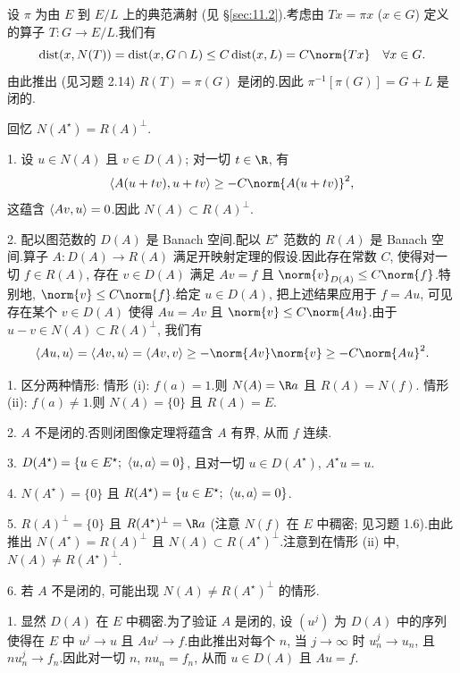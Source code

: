 
设 $\pi$ 为由 $E$ 到 $E/L$ 上的典范满射 (见 \S \ref{sec:11.2}).考虑由
$Tx=\pi x$ ($x\in G$) 定义的算子 $T:G\to E/L$.我们有
\begin{equation*}
\dist(x,N(T))=\dist(x,G\cap L)\le C\dist(x,L)=C\norm{Tx}\quad\forall x\in G.
\end{equation*}
由此推出 (见习题 2.14) $R(T)=\pi(G)$ 是闭的.因此 $\pi^{-1}[\pi(G)]=G+L$
是闭的.


回忆 $N(A^\star)=R(A)^\perp$.

1. 设 $u\in N(A)$ 且 $v\in D(A)$; 对一切 $t\in\R$, 有
\begin{equation*}
\dual{A(u+tv)}{u+tv}\ge-C\norm{A(u+tv)}^2,
\end{equation*}
这蕴含 $\left\langle Av,u\right\rangle=0$.因此 $N(A)\subset R(A)^\perp$.

2. 配以图范数的 $D(A)$ 是 Banach 空间.配以 $E^\star$ 范数的 $R(A)$ 是
Banach 空间.算子 $A:D(A)\to R(A)$ 满足开映射定理的假设.因此存在常数 $C$,
使得对一切 $f\in R(A)$, 存在 $v\in D(A)$ 满足 $Av=f$ 且
$\norm{v}_{D(A)}\le C\norm{f}$.特别地, $\norm{v}\le C\norm{f}$.给定
$u\in D(A)$, 把上述结果应用于 $f=Au$, 可见存在某个 $v\in D(A)$ 使得
$Au=Av$ 且 $\norm{v}\le C\norm{Au}$.由于 $u-v\in N(A)\subset R(A)^\perp$,
我们有
\begin{equation*}
\dual{Au}{u}=\dual{Av}{u}=\dual{Av}{v}\ge-\norm{Av}\norm{v}\ge-C\norm{Au}^2.
\end{equation*}


1. 区分两种情形: 情形 (i): $f(a)=1$.则 $N(A)=\R a$ 且 $R(A)=N(f)$.
情形 (ii): $f(a)\ne1$.则 $N(A)=\{0\}$ 且 $R(A)=E$.

2. $A$ 不是闭的.否则闭图像定理将蕴含 $A$ 有界, 从而 $f$ 连续.

3. $D(A^\star)=\{u\in E^\star;\ \dual{u}{a}=0\}$, 且对一切
$u\in D(A^\star)$, $A^\star u=u$.

4. $N(A^\star)=\{0\}$ 且 $R(A^\star)=\{u\in E^\star;\ \dual{u}{a}=0\}$.

5. $R(A)^\perp=\{0\}$ 且 $R(A^\star)^\perp=\R a$ (注意 $N(f)$ 在 $E$ 中稠密;
见习题 1.6).由此推出 $N(A^\star)=R(A)^\perp$ 且
$N(A)\subset R(A^\star)^\perp$.注意到在情形 (ii) 中,
$N(A)\ne R(A^\star)^\perp$.

6. 若 $A$ 不是闭的, 可能出现 $N(A)\ne R(A^\star)^\perp$ 的情形.


1. 显然 $D(A)$ 在 $E$ 中稠密.为了验证 $A$ 是闭的, 设 $(u^j)$ 为 $D(A)$
中的序列使得在 $E$ 中 $u^j\to u$ 且 $Au^j\to f$.由此推出对每个 $n$, 当
$j\to\infty$ 时 $u_n^j\to u_n$, 且 $nu_n^j\to f_n$.因此对一切 $n$,
$nu_n=f_n$, 从而 $u\in D(A)$ 且 $Au=f$.

